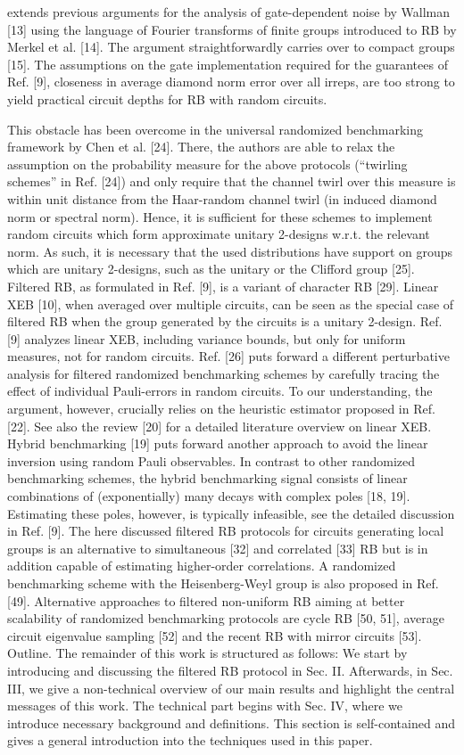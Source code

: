 extends previous arguments for the analysis of gate-dependent noise by Wallman [13] using the language of Fourier transforms of finite groups introduced to RB by Merkel et al. [14]. The argument straightforwardly carries over to compact groups [15]. The assumptions on the gate implementation required for the guarantees of Ref. [9], closeness in average diamond norm error over all irreps, are too strong to yield practical circuit depths for RB with random circuits.

This obstacle has been overcome in the universal randomized benchmarking framework by Chen et al. [24]. There, the authors are able to relax the assumption on the probability measure for the above protocols (“twirling schemes” in Ref. [24]) and only require that the channel twirl over this measure is within unit distance from the Haar-random channel twirl (in induced diamond norm or spectral norm). Hence, it is sufficient for these schemes to implement random circuits which form approximate unitary 2-designs w.r.t. the relevant norm. As such, it is necessary that the used distributions have support on groups which are unitary 2-designs, such as the unitary or the Clifford group [25]. Filtered RB, as formulated in Ref. [9], is a variant of character RB [29]. Linear XEB [10], when averaged over multiple circuits, can be seen as the special case of filtered RB when the group generated by the circuits is a unitary 2-design. Ref. [9] analyzes linear XEB, including variance bounds, but only for uniform measures, not for random circuits. Ref. [26] puts forward a different perturbative analysis for filtered randomized benchmarking schemes by carefully tracing the effect of individual Pauli-errors in random circuits. To our understanding, the argument, however, crucially relies on the heuristic estimator proposed in Ref. [22]. See also the review [20] for a detailed literature overview on linear XEB. Hybrid benchmarking [19] puts forward another approach to avoid the linear inversion using random Pauli observables. In contrast to other randomized benchmarking schemes, the hybrid benchmarking signal consists of linear combinations of (exponentially) many decays with complex poles [18, 19]. Estimating these poles, however, is typically infeasible, see the detailed discussion in Ref. [9]. The here discussed filtered RB protocols for circuits generating local groups is an alternative to simultaneous [32] and correlated [33] RB but is in addition capable of estimating higher-order correlations. A randomized benchmarking scheme with the Heisenberg-Weyl group is also proposed in Ref. [49]. Alternative approaches to filtered non-uniform RB aiming at better scalability of randomized benchmarking protocols are cycle RB [50, 51], average circuit eigenvalue sampling [52] and the recent RB with mirror circuits [53]. Outline. The remainder of this work is structured as follows: We start by introducing and discussing the filtered RB protocol in Sec. II. Afterwards, in Sec. III, we give a non-technical overview of our main results and highlight the central messages of this work. The technical part begins with Sec. IV, where we introduce necessary background and definitions. This section is self-contained and gives a general introduction into the techniques used in this paper. 